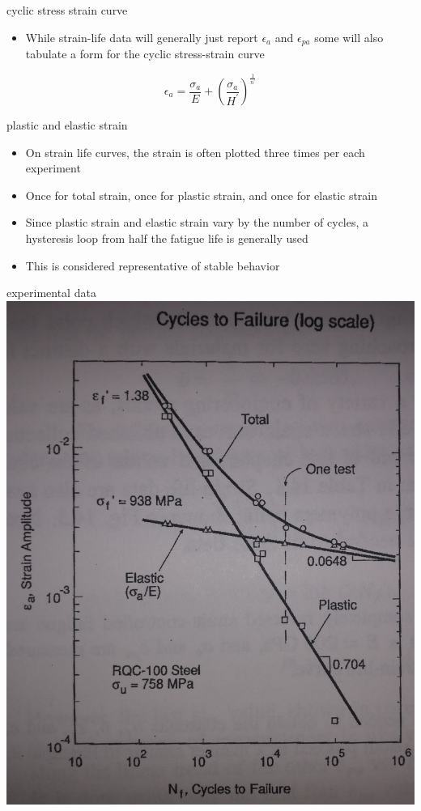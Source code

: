\documentclass[
  letterpaper,
  ignorenonframetext,
  aspectratio=43,
  handout,
  12pt]{beamer}
\providecommand{\tightlist}{%
  \setlength{\itemsep}{0pt}\setlength{\parskip}{0pt}}
\providecommand{\tightlist}{%
\setlength{\itemsep}{0pt}\setlength{\parskip}{0pt}}
\let\Oldincludegraphics\includegraphics
\renewcommand{\includegraphics}[2][]{\Oldincludegraphics[width=\textwidth,height=0.7\textheight,keepaspectratio]{#2}}
\begin{document}
\begin{frame}{cyclic stress strain curve}
\protect\hypertarget{cyclic-stress-strain-curve}{}
\begin{itemize}
\tightlist
\item
  While strain-life data will generally just report \(\epsilon_a\) and
  \(\epsilon_{pa}\) some will also tabulate a form for the cyclic
  stress-strain curve
\end{itemize}

\[\epsilon_a = \frac{\sigma_a}{E} + \left(\frac{\sigma_a}{H^\prime}\right)^{\frac{1}{n^\prime}}\]
\end{frame}

\begin{frame}{plastic and elastic strain}
\protect\hypertarget{plastic-and-elastic-strain-1}{}
\begin{itemize}
\tightlist
\item
  On strain life curves, the strain is often plotted three times per
  each experiment
\item
  Once for total strain, once for plastic strain, and once for elastic
  strain
\item
  Since plastic strain and elastic strain vary by the number of cycles,
  a hysteresis loop from half the fatigue life is generally used
\item
  This is considered representative of stable behavior
\end{itemize}
\end{frame}

\begin{frame}{experimental data}
\protect\hypertarget{experimental-data}{}
\includegraphics{../images/strain-life.jpg}
\end{frame}
\end{document}
